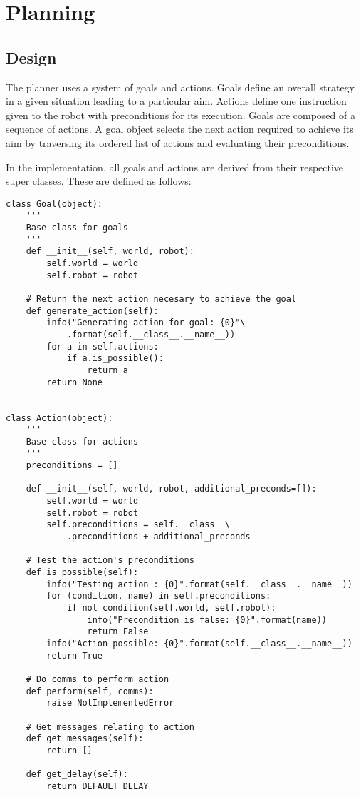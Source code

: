 \section{Planning}
\lstset{language=Python, showstringspaces=false}

\subsection{Design}

The planner uses a system of goals and actions. Goals define an overall strategy in a given situation leading to a particular aim. Actions define one instruction given to the robot with preconditions for its execution. Goals are composed of a sequence of actions. A goal object selects the next action required to achieve its aim by traversing its ordered list of actions and evaluating their preconditions.

In the implementation, all goals and actions are derived from their respective super classes. These are defined as follows:

\begin{lstlisting}
class Goal(object):
    '''
    Base class for goals
    '''
    def __init__(self, world, robot):
        self.world = world
        self.robot = robot

    # Return the next action necesary to achieve the goal
    def generate_action(self):
        info("Generating action for goal: {0}"\
        	.format(self.__class__.__name__))
        for a in self.actions:
            if a.is_possible():
                return a
        return None


class Action(object):
    '''
    Base class for actions
    '''
    preconditions = []

    def __init__(self, world, robot, additional_preconds=[]):
        self.world = world
        self.robot = robot
        self.preconditions = self.__class__\
        	.preconditions + additional_preconds

    # Test the action's preconditions
    def is_possible(self):
        info("Testing action : {0}".format(self.__class__.__name__))
        for (condition, name) in self.preconditions:
            if not condition(self.world, self.robot):
                info("Precondition is false: {0}".format(name))
                return False
        info("Action possible: {0}".format(self.__class__.__name__))
        return True

    # Do comms to perform action
    def perform(self, comms):
        raise NotImplementedError

    # Get messages relating to action
    def get_messages(self):
        return []

    def get_delay(self):
        return DEFAULT_DELAY

\end{lstlisting}

